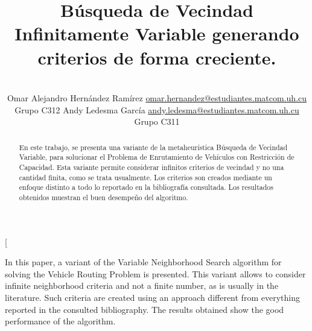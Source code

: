 \documentclass[a4paper,10pt,twocolumn]{article}
\title{Búsqueda de Vecindad Infinitamente Variable generando criterios de forma creciente.}
\author{\\
\name Omar Alejandro Hernández Ramírez \email \href{mailto:omar.hernandez@estudiantes.matcom.uh.cu}{omar.hernandez@estudiantes.matcom.uh.cu}
	\\ \addr Grupo C312 \AND
\name Andy Ledesma García \email \href{mailto:andy.ledesma@estudiantes.matcom.uh.cu}
{andy.ledesma@estudiantes.matcom.uh.cu}
  \\ \addr Grupo C311}
\begin{document}
\twocolumn[

\maketitle


\begin{abstract}

  En este trabajo, se presenta una variante de la metaheurística Búsqueda de Vecindad
  Variable, para solucionar el Problema de Enrutamiento de Vehículos con Restricción 
  de Capacidad. Esta variante permite considerar infinitos criterios de vecindad y no 
  una cantidad finita, como se trata usualmente. Los criterios son creados mediante un enfoque distinto a todo lo reportado en la bibliograf\'ia consultada. Los resultados obtenidos muestran el
  buen desempeño del algoritmo.

\end{abstract}

\vspace{0.5cm}

\begin{enabstract}

  In this paper, a variant of the Variable Neighborhood Search algorithm for solving
  the Vehicle Routing Problem is presented. This variant allows to consider infinite
  neighborhood criteria and not a finite number, as is usually in the literature. Such criteria are created using an approach different from everything reported in the consulted bibliography. The results
  obtained show the good performance of the algorithm.

\end{enabstract}
\end{document}
